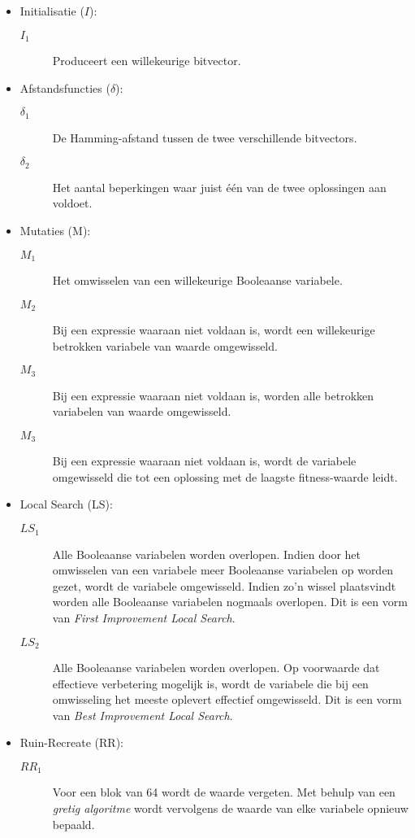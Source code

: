 \begin{itemize}
 \item Initialisatie ($I$):
\begin{description}
 \item [$I_1$] Produceert een willekeurige bitvector.
\end{description}
 \item Afstandsfuncties ($\delta$):
\begin{description}
 \item [$\delta_1$] De Hamming-afstand tussen de twee verschillende bitvectors.
 \item [$\delta_2$] Het aantal beperkingen waar juist \'e\'en van de twee oplossingen aan voldoet.
\end{description}
 \item Mutaties (M):
\begin{description}
 \item [$M_1$] Het omwisselen van een willekeurige Booleaanse variabele.
 \item [$M_2$] Bij een expressie waaraan niet voldaan is, wordt een willekeurige betrokken variabele van waarde omgewisseld.
 \item [$M_3$] Bij een expressie waaraan niet voldaan is, worden alle betrokken variabelen van waarde omgewisseld.
 \item [$M_3$] Bij een expressie waaraan niet voldaan is, wordt de variabele omgewisseld die tot een oplossing met de laagste fitness-waarde leidt.
\end{description}
 \item Local Search (LS):
\begin{description}
 \item [$LS_1$] Alle Booleaanse variabelen worden overlopen. Indien door het omwisselen van een variabele meer Booleaanse variabelen op \true{} worden gezet, wordt de variabele omgewisseld. Indien zo'n wissel plaatsvindt worden alle Booleaanse variabelen nogmaals overlopen. Dit is een vorm van \emph{First Improvement Local Search}.
 \item [$LS_2$] Alle Booleaanse variabelen worden overlopen. Op voorwaarde dat effectieve verbetering mogelijk is, wordt de variabele die bij een omwisseling het meeste oplevert effectief omgewisseld. Dit is een vorm van \emph{Best Improvement Local Search}.
\end{description}
 \item Ruin-Recreate (RR):
\begin{description}
 \item [$RR_1$] Voor een blok van 64 wordt de waarde vergeten. Met behulp van een \emph{gretig algoritme} wordt vervolgens de waarde van elke variabele opnieuw bepaald.

\end{description}
\end{itemize}
